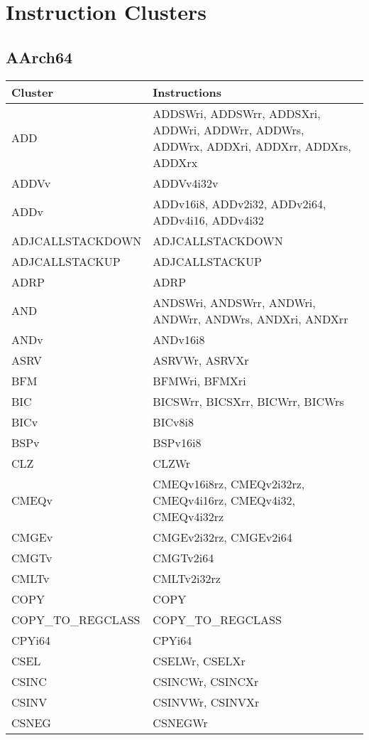 \chapter{Instruction Clusters}
\label{appendix:instr-clusters}
\section{AArch64}
\begin{xltabular}{\textwidth}{lX}
    \toprule
    Cluster & Instructions \\
    \midrule
    \endhead

    \bottomrule
    \endfoot

    ADD & ADDSWri, ADDSWrr, ADDSXri, ADDWri, ADDWrr, ADDWrs, ADDWrx, ADDXri, ADDXrr, ADDXrs, ADDXrx \\
    ADDVv & ADDVv4i32v \\
    ADDv & ADDv16i8, ADDv2i32, ADDv2i64, ADDv4i16, ADDv4i32 \\
    ADJCALLSTACKDOWN & ADJCALLSTACKDOWN \\
    ADJCALLSTACKUP & ADJCALLSTACKUP \\
    ADRP & ADRP \\
    AND & ANDSWri, ANDSWrr, ANDWri, ANDWrr, ANDWrs, ANDXri, ANDXrr \\
    ANDv & ANDv16i8 \\
    ASRV & ASRVWr, ASRVXr \\
    BFM & BFMWri, BFMXri \\
    BIC & BICSWrr, BICSXrr, BICWrr, BICWrs \\
    BICv & BICv8i8 \\
    BSPv & BSPv16i8 \\
    CLZ & CLZWr \\
    CMEQv & CMEQv16i8rz, CMEQv2i32rz, CMEQv4i16rz, CMEQv4i32, CMEQv4i32rz \\
    CMGEv & CMGEv2i32rz, CMGEv2i64 \\
    CMGTv & CMGTv2i64 \\
    CMLTv & CMLTv2i32rz \\
    COPY & COPY \\
    COPY\_TO\_REGCLASS & COPY\_TO\_REGCLASS \\
    CPYi64 & CPYi64 \\
    CSEL & CSELWr, CSELXr \\
    CSINC & CSINCWr, CSINCXr \\
    CSINV & CSINVWr, CSINVXr \\
    CSNEG & CSNEGWr \\

\end{xltabular}

